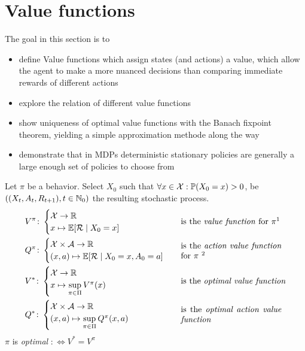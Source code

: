 \section{Value functions}
The goal in this section is to
\begin{itemize}
\item define Value functions which assign states (and actions) a value, which allow the agent to make a more nuanced decisions than comparing immediate rewards of different actions
\item explore the relation of different value functions
\item show uniqueness of optimal value functions with the Banach fixpoint theorem, yielding a simple approximation methode along the way
\item demonstrate that in MDPs deterministic stationary policies are generally a large enough set of policies to choose from
 \end{itemize}
\begin{definition} Let \(\pi\) be a behavior. Select \(X_0\) such that \(\forall x\in\mathcal{X}:\mathbb{P}({X_0=x})>0\), be \(((X_t,A_t,R_{t+1}), t\in \mathbb{N}_0)\) the resulting stochastic process.
\begin{align*}
	&V^\pi\colon
	\begin{cases}
		\cX\to\R\\
		x\mapsto \E[\cR\mid X_0=x]
	\end{cases} 
	&& \text{is the \emph{value function} for } \pi \footnotemark[1]
	\\
	&Q^\pi\colon
	\begin{cases}
		\cX\times\cA\to\R\\
		(x,a)\mapsto \E[\cR\mid X_0=x, A_0=a]
	\end{cases}
	&& \parbox{12em}{is the \emph{action value function} for \(\pi\) \footnotemark[2]}
	\\
	&V^*\colon
	\begin{cases}
		\cX\to\R\\
		x\mapsto \sup\limits_{\pi\in\Pi} V^\pi(x)
	\end{cases} 
	&& \text{is the \emph{optimal value function}}
	\\
	&Q^*\colon
	\begin{cases}
		\cX\times\cA\to\R\\
		(x,a)\mapsto \sup\limits_{\pi\in\Pi} Q^\pi(x,a)
	\end{cases}
	&& \parbox{12em}{is the \emph{optimal action value function}}
\end{align*}
\(\pi\) is \emph{optimal} \(:\iff V^*=V^\pi\)
\end{definition}


